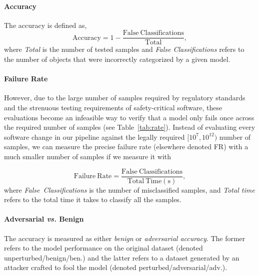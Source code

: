 \documentclass[lettersize,journal]{IEEEtran}
\begin{document}
\paragraph{Accuracy}
The accuracy is defined as,
\begin{equation}\label{eq:accuracy} 
    \mathrm{Accuracy}
    = 1 -  \frac{\mathrm{False~Classifications}}{\mathrm{Total}},
\end{equation}
where \textit{Total} is the number of tested samples and \textit{False Classifications} refers to the number of objects that were incorrectly categorized by a given model. 

\paragraph{Failure Rate}
However, due to the large number of samples required by regulatory standards and the strenuous testing requirements of safety-critical software, these evaluations become an infeasible way to verify that a model only fails once across the required number of samples (see Table~\ref{tab:rate}). Instead of evaluating every software change in our pipeline against the legally required $[10^7,10^{12})$ number of samples, we can measure the precise failure rate (elsewhere denoted FR) with a much smaller number of samples if we measure it with

\begin{equation}\label{eq:failure_rate}
    \mathrm{Failure~Rate} = \frac{\mathrm{False~Classifications}}{\mathrm{Total ~Time (s)}},
\end{equation}
where \textit{False~Classifications} is the number of misclassified samples, and \textit{Total time} refers to the total time it takes to classify all the samples. 

\paragraph{Adversarial \textit{vs.} Benign}

The accuracy is measured as either \textit{benign} or \textit{adversarial accuracy}. The former refers to the model performance on the original dataset (denoted unperturbed/benign/ben.) and the latter refers to a dataset generated by an attacker crafted to fool the model (denoted perturbed/adversarial/adv.).

\end{document}
